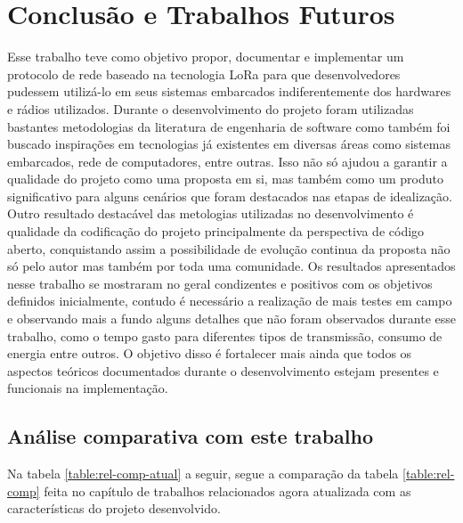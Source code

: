 \chapter{Conclusão e Trabalhos Futuros}

Esse trabalho teve como objetivo propor, documentar e implementar um protocolo
de rede baseado na tecnologia LoRa para que desenvolvedores pudessem utilizá-lo
em seus sistemas embarcados indiferentemente dos hardwares e rádios utilizados.
Durante o desenvolvimento do projeto foram utilizadas bastantes metodologias da
literatura de engenharia de software como também foi buscado inspirações em tecnologias
já existentes em diversas áreas como sistemas embarcados, rede de computadores,
entre outras. Isso não só ajudou a garantir a qualidade do projeto como uma proposta
em si, mas também como um produto significativo para alguns cenários que foram
destacados nas etapas de idealização. Outro resultado destacável das metologias
utilizadas no desenvolvimento é qualidade da codificação do projeto principalmente
da perspectiva de código aberto, conquistando assim a possibilidade de evolução
continua da proposta não só pelo autor mas também por toda uma comunidade.
Os resultados apresentados nesse trabalho se mostraram no geral condizentes e
positivos com os objetivos definidos inicialmente, contudo é necessário a
realização de mais testes em campo e observando mais a fundo alguns detalhes
que não foram observados durante esse trabalho, como o tempo gasto para
diferentes tipos de transmissão, consumo de energia entre outros. O objetivo
disso é fortalecer mais ainda que todos os aspectos teóricos documentados
durante o desenvolvimento estejam presentes e funcionais na implementação.

\section{Análise comparativa com este trabalho}

Na tabela \ref{table:rel-comp-atual} a seguir, segue a comparação da tabela \ref{table:rel-comp} feita no capítulo de trabalhos relacionados agora atualizada com as características do projeto desenvolvido.

